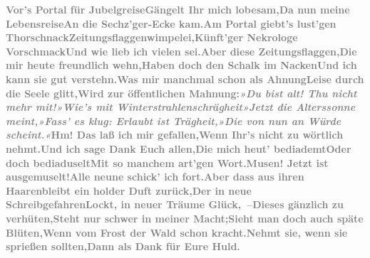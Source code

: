 \toendnotes[C]{\smallbreak}\stanza{}{\pb}\textcolor{gray}{\textbf{Vor’s Portal für Jubelgreise}}\newverse{}\textcolor{gray}{\textbf{Gängelt Ihr mich lobesam,}}\newverse{}\textcolor{gray}{\textbf{Da nun meine Lebensreise}}\newverse{}\textcolor{gray}{\textbf{An die Sechz’ger-Ecke kam.}}\stanzaend{}\stanza{}\textcolor{gray}{\textbf{Am Portal giebt’s lust’gen Thorschnack}}\newverse{}\textcolor{gray}{\textbf{Zeitungsflaggenwimpelei,}}\newverse{}\textcolor{gray}{\textbf{Künft’ger Nekrologe Vorschmack}}\newverse{}\textcolor{gray}{\textbf{Und wie lieb ich vielen sei.}}\stanzaend{}\stanza{}\textcolor{gray}{\textbf{Aber diese Zeitungsflaggen,}}\newverse{}\textcolor{gray}{\textbf{Die mir heute freundlich wehn,}}\newverse{}\textcolor{gray}{\textbf{Haben doch den Schalk im Nacken}}\newverse{}\textcolor{gray}{\textbf{Und ich kann sie gut verstehn.}}\stanzaend{}\stanza{}\textcolor{gray}{\textbf{Was mir manchmal schon als Ahnung}}\newverse{}\textcolor{gray}{\textbf{Leise durch die Seele glitt,}}\newverse{}\textcolor{gray}{\textbf{Wird zur öffentlichen Mahnung:}}\newverse{}\textcolor{gray}{\textbf{\emph{»Du bist alt! Thu nicht mehr mit!}}}\stanzaend{}\stanza{}\textcolor{gray}{\textbf{\emph{»Wie’s mit Winterstrahlenschrägheit}}}\newverse{}\textcolor{gray}{\textbf{\emph{»Jetzt die Alterssonne meint,}}}\newverse{}\textcolor{gray}{\textbf{\emph{»Fass’ es klug: Erlaubt ist Trägheit,}}}\newverse{}\textcolor{gray}{\textbf{\emph{»Die von nun an Würde scheint.«}}}\stanzaend{}\stanza{}{\pb}\textcolor{gray}{\textbf{Hm! Das laß ich mir gefallen,}}\newverse{}\textcolor{gray}{\textbf{Wenn Ihr’s nicht zu wörtlich nehmt.}}\newverse{}\textcolor{gray}{\textbf{Und ich sage Dank Euch allen,}}\newverse{}\textcolor{gray}{\textbf{Die mich heut’ bediademt}}\stanzaend{}\stanza{}\textcolor{gray}{\textbf{Oder doch bediaduselt}}\newverse{}\textcolor{gray}{\textbf{Mit so manchem art’gen Wort.}}\newverse{}\textcolor{gray}{\textbf{Musen! Jetzt ist ausgemuselt!}}\newverse{}\textcolor{gray}{\textbf{Alle neune schick’ ich fort.}}\stanzaend{}\stanza{}\textcolor{gray}{\textbf{Aber dass aus ihren Haaren}}\newverse{}\textcolor{gray}{\textbf{bleibt ein holder Duft zurück,}}\newverse{}\textcolor{gray}{\textbf{Der in neue Schreibgefahren}}\newverse{}\textcolor{gray}{\textbf{Lockt, in neuer Träume Glück, –}}\stanzaend{}\stanza{}\textcolor{gray}{\textbf{Dieses gänzlich zu verhüten,}}\newverse{}\textcolor{gray}{\textbf{Steht nur schwer in meiner Macht;}}\newverse{}\textcolor{gray}{\textbf{Sieht man doch auch späte Blüten,}}\newverse{}\textcolor{gray}{\textbf{Wenn vom Frost der Wald schon kracht.}}\stanzaend{}\stanza{}\textcolor{gray}{\textbf{Nehmt sie, wenn sie sprießen sollten,}}\newverse{}\textcolor{gray}{\textbf{Dann als Dank für Eure Huld.}}\newverse{}\textcolor{gray}{\textbf{}}\newverse{}\textcolor{gray}{\textbf{}}\stanzaend{}
